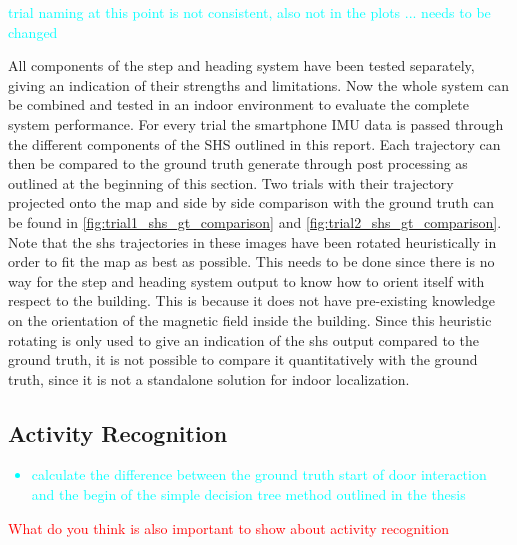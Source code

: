 \textcolor{cyan}{trial naming at this point is not consistent, also not in the plots ... needs to be changed}

All components of the step and heading system have been tested separately, giving an indication of their strengths and limitations. Now the whole system can be combined and tested in an indoor environment to evaluate the complete system performance.
For every trial the smartphone IMU data is passed through the different components of the SHS outlined in this report. Each trajectory can then be compared to the ground truth generate through post processing as outlined at the beginning of this section. Two trials with their trajectory projected onto the map and side by side comparison with the ground truth can be found in \cref{fig:trial1_shs_gt_comparison} and \cref{fig:trial2_shs_gt_comparison}. Note that the shs trajectories in these images have been rotated heuristically in order to fit the map as best as possible. This needs to be done since there is no way for the step and heading system output to know how to orient itself with respect to the building. This is because it does not have pre-existing knowledge on the orientation of the magnetic field inside the building. Since this heuristic rotating is only used to give an indication of the shs output compared to the ground truth, it is not possible to compare it quantitatively with the ground truth, since it is not a standalone solution for indoor localization.

\newpage
\subsection{Activity Recognition}
\textcolor{cyan}{
\begin{itemize}
	\item calculate the difference between the ground truth start of door interaction and the begin of the simple decision tree method outlined in the thesis
\end{itemize}}

\textcolor{red}{What do you think is also important to show about activity recognition}

